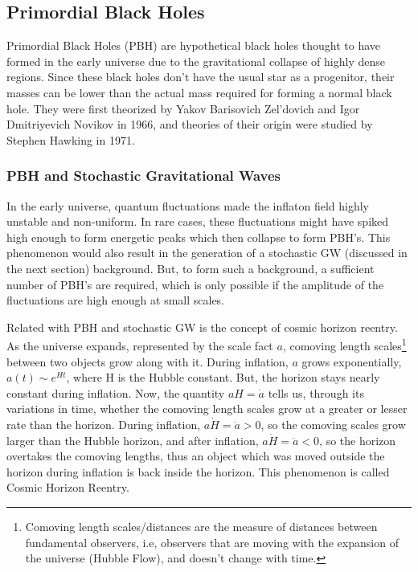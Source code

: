 \subsection{Primordial Black Holes}
Primordial Black Holes (PBH) are hypothetical black holes thought to have formed in the early universe due to the gravitational collapse of highly dense regions. Since these black holes don't have the usual star as a progenitor, their masses can be lower than the actual mass required for forming a normal black hole. They were first theorized by Yakov Barisovich Zel'dovich and Igor Dmitriyevich Novikov in 1966, and theories of their origin were studied by Stephen Hawking in 1971. 

\subsubsection{PBH and Stochastic Gravitational Waves}
In the early universe, quantum fluctuations made the inflaton field highly unstable and non-uniform. In rare cases, these fluctuations might have spiked high enough to form energetic peaks which then collapse to form PBH's. This phenomenon would also result in the generation of a stochastic GW (discussed in the next section) background. But, to form such a background, a sufficient number of PBH's are required, which is only possible if the amplitude of the fluctuations are high enough at small scales.

Related with PBH and stochastic GW is the concept of cosmic horizon reentry. As the universe expands, represented by the scale fact $a$, comoving length scales\footnote{Comoving length scales/distances are the measure of distances between fundamental observers, i.e, observers that are moving with the expansion of the universe (Hubble Flow), and doesn't change with time.}  between two objects grow along with it. During inflation, $a$ grows exponentially, $a(t) \sim e^{Ht}$, where H is the Hubble constant. But, the horizon stays nearly constant during inflation. Now, the quantity $aH = \dot{a}$ tells us, through its variations in time, whether the comoving length scales grow at a greater or lesser rate than the horizon. During inflation, $a\dot{H} = \ddot{a} > 0$, so the comoving scales grow larger than the Hubble horizon, and after inflation, $a\dot{H} = \ddot{a} < 0$, so the horizon overtakes the comoving lengths, thus an object which was moved outside the horizon during inflation is back inside the horizon. This phenomenon is called Cosmic Horizon Reentry.

